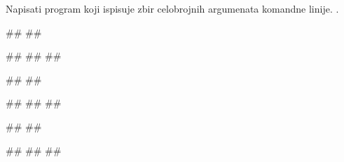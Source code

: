 \begin{Exercise}[label=p2.6_01] 
Napisati program koji ispisuje zbir celobrojnih argumenata komandne linije. 
.

\begin{minitest}
\begin{upotreba}{1}
#\naslovPokretanje#
##

#\naslovIzlaz#
##
##
\end{upotreba}
\end{minitest}
\begin{minitest}
\begin{upotreba}{2}
#\naslovPokretanje#
##

#\naslovIzlaz#
##
##
\end{upotreba}
\end{minitest}
\begin{minitest}
\begin{upotreba}{3}
#\naslovPokretanje#
##

#\naslovIzlaz#
##
##
\end{upotreba}
\end{minitest}
\end{Exercise}
\ifresenja
\begin{Answer}[ref=p2.6_01]
\end{Answer}
 \fi

